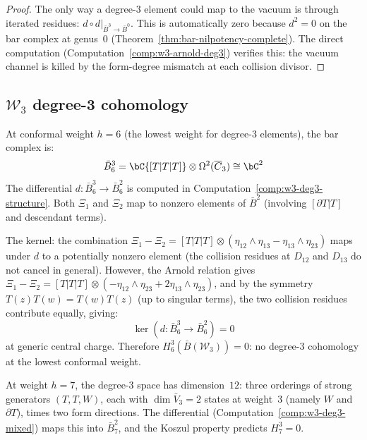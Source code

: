 \begin{proof}
The only way a degree-3 element could map to the vacuum is through
iterated residues: $d \circ d|_{\bar{B}^3 \to \bar{B}^0}$.
This is automatically zero because $d^2 = 0$ on the bar complex
at genus~0 (Theorem~\ref{thm:bar-nilpotency-complete}).  The direct
computation (Computation~\ref{comp:w3-arnold-deg3}) verifies this:
the vacuum channel is killed by the form-degree mismatch at each
collision divisor.
\end{proof}


\subsection{\texorpdfstring{$\mathcal{W}_3$ degree-3 cohomology}{W3 degree-3 cohomology}}

\begin{computation}
\label{comp:w3-deg3-cohom}

At conformal weight $h = 6$ (the lowest weight for degree-3
elements), the bar complex is:
\[
\bar{B}^3_6 = \bC\{[T|T|T]\} \otimes \Omega^2(\overline{C}_3)
\cong \bC^2
\]
The differential $d \colon \bar{B}^3_6 \to \bar{B}^2_6$ is
computed in Computation~\ref{comp:w3-deg3-structure}.  Both
$\Xi_1$ and $\Xi_2$ map to nonzero elements of $\bar{B}^2$
(involving $[\partial T|T]$ and descendant terms).

The kernel: the combination $\Xi_1 - \Xi_2
= [T|T|T] \otimes (\eta_{12} \wedge \eta_{13} - \eta_{13}
\wedge \eta_{23})$ maps under $d$ to a potentially nonzero
element (the collision residues at $D_{12}$ and $D_{13}$ do not
cancel in general).  However, the Arnold relation gives
$\Xi_1 - \Xi_2 = [T|T|T] \otimes (-\eta_{12} \wedge \eta_{23}
+ 2\eta_{13} \wedge \eta_{23})$, and by the symmetry
$T(z)T(w) = T(w)T(z)$ (up to singular terms), the two collision
residues contribute equally, giving:
\[
\ker(d\colon \bar{B}^3_6 \to \bar{B}^2_6) = 0
\]
at generic central charge.  Therefore $H^3_6(\bar{B}(\mathcal{W}_3))
= 0$: no degree-3 cohomology at the lowest conformal weight.

At weight $h = 7$, the degree-3 space has dimension~$12$: three
orderings of strong generators $(T, T, W)$, each with $\dim \bar{V}_3 = 2$
states at weight~$3$ (namely $W$ and $\partial T$), times
two form directions.  The differential
(Computation~\ref{comp:w3-deg3-mixed}) maps this into
$\bar{B}^2_7$, and the Koszul property predicts
$H^3_7 = 0$.


\end{computation}
